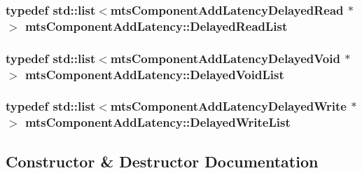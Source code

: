 \subsubsection[{Delayed\+Read\+List}]{\setlength{\rightskip}{0pt plus 5cm}typedef std\+::list$<$mts\+Component\+Add\+Latency\+Delayed\+Read $\ast$$>$ {\bf mts\+Component\+Add\+Latency\+::\+Delayed\+Read\+List}\hspace{0.3cm}{\ttfamily [protected]}}\label{classmts_component_add_latency_a527c29b91f407598cb31a8113d453610}
\hypertarget{classmts_component_add_latency_a693394372f8f73601e8f46ab5a5a1780}{}
\subsubsection[{Delayed\+Void\+List}]{\setlength{\rightskip}{0pt plus 5cm}typedef std\+::list$<$mts\+Component\+Add\+Latency\+Delayed\+Void $\ast$$>$ {\bf mts\+Component\+Add\+Latency\+::\+Delayed\+Void\+List}\hspace{0.3cm}{\ttfamily [protected]}}\label{classmts_component_add_latency_a693394372f8f73601e8f46ab5a5a1780}
\hypertarget{classmts_component_add_latency_a050cbf3819eb668c8098a78257e22236}{}
\subsubsection[{Delayed\+Write\+List}]{\setlength{\rightskip}{0pt plus 5cm}typedef std\+::list$<$mts\+Component\+Add\+Latency\+Delayed\+Write $\ast$$>$ {\bf mts\+Component\+Add\+Latency\+::\+Delayed\+Write\+List}\hspace{0.3cm}{\ttfamily [protected]}}\label{classmts_component_add_latency_a050cbf3819eb668c8098a78257e22236}


\subsection{Constructor \& Destructor Documentation}
\hypertarget{classmts_component_add_latency_a5e9722e59155cf09209eafccbd263632}{}
